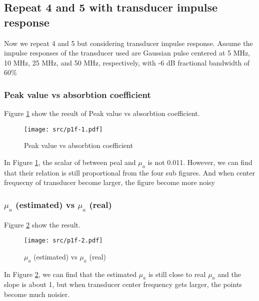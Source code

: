 \documentclass{article}
\begin{document}
\subsection{Repeat 4 and 5 with transducer impulse response}
Now we repeat 4 and 5 but considering transducer impulse response. Assume the impulse responses of the transducer used are 
Gaussian pulse centered at 5 MHz, 10 MHz, 25 MHz, and 50 MHz, respectively, with -6 dB fractional bandwidth of 60\%

\subsubsection{Peak value vs absorbtion coefficient}
Figure \ref{fig:p1f-1} show the result of Peak value vs absorbtion coefficient.
\begin{figure}[H]
    \centering
    \texttt{[image: src/p1f-1.pdf]}
    \caption{Peak value vs absorbtion coefficient}
    \label{fig:p1f-1}
\end{figure}
In Figure \ref{fig:p1f-1}, the scalar of between peal and $\mu_a$ is not 0.011. However, we can find that their relation is still 
proportional from the four sub figures. And when center frequecny of transducer become larger, the figure become more noisy

\subsubsection{$\mu_a$ (estimated) vs $\mu_a$ (real)}
Figure \ref{fig:p1f-2} show the result.
\begin{figure}[H]
    \centering
    \texttt{[image: src/p1f-2.pdf]}
    \caption{$\mu_a$ (estimated) vs $\mu_a$ (real)}
    \label{fig:p1f-2}
\end{figure}
In Figure \ref{fig:p1f-2}, we can find that the estimated $\mu_a$ is still close to real $\mu_a$ and the slope is about 1, 
but when transducer center frequency gets larger, the points become much noisier.
\end{document}
